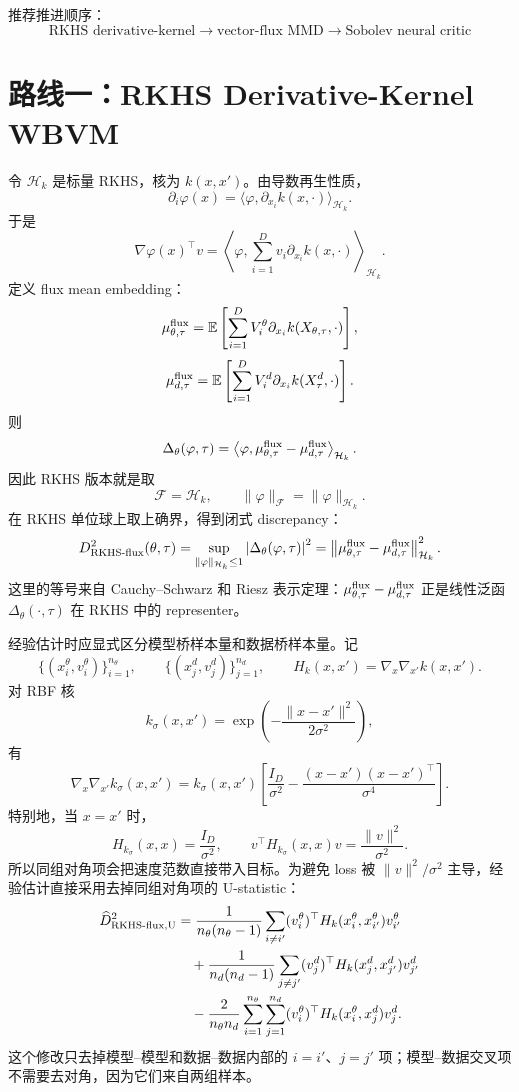 \documentclass[UTF8,11pt]{ctexart}
\newcommand{\E}{\mathbb{E}}
\newcommand{\cH}{\mathcal{H}}
\newcommand{\cF}{\mathcal{F}}
\begin{document}
推荐推进顺序：
\[
\boxed{
\text{RKHS derivative-kernel}
\rightarrow
\text{vector-flux MMD}
\rightarrow
\text{Sobolev neural critic}
}
\]

\section{路线一：RKHS Derivative-Kernel WBVM}

令 \(\cH_k\) 是标量 RKHS，核为 \(k(x,x')\)。由导数再生性质，
\[
\partial_i\varphi(x)
=
\langle \varphi,\partial_{x_i}k(x,\cdot)\rangle_{\cH_k}.
\]
于是
\[
\nabla\varphi(x)^\top v
=
\left\langle
\varphi,
\sum_{i=1}^D v_i\partial_{x_i}k(x,\cdot)
\right\rangle_{\cH_k}.
\]
定义 flux mean embedding：
\[
\mu_{\theta,\tau}^{\rm flux}
=
\E\left[
\sum_{i=1}^D V_i^\theta
\partial_{x_i}k(X_{\theta,\tau},\cdot)
\right],
\]
\[
\mu_{d,\tau}^{\rm flux}
=
\E\left[
\sum_{i=1}^D V_i^d
\partial_{x_i}k(X_\tau^d,\cdot)
\right].
\]
则
\[
\Delta_\theta(\varphi,\tau)
=
\left\langle
\varphi,
\mu_{\theta,\tau}^{\rm flux}
-
\mu_{d,\tau}^{\rm flux}
\right\rangle_{\cH_k}.
\]
因此 RKHS 版本就是取
\[
\cF=\cH_k,
\qquad
\|\varphi\|_{\cF}=\|\varphi\|_{\cH_k}.
\]
在 RKHS 单位球上取上确界，得到闭式 discrepancy：
\[
D_{\rm RKHS\text{-}flux}^2(\theta,\tau)
=
\sup_{\|\varphi\|_{\cH_k}\le 1}
\left|
\Delta_\theta(\varphi,\tau)
\right|^2
=
\left\|
\mu_{\theta,\tau}^{\rm flux}
-
\mu_{d,\tau}^{\rm flux}
\right\|_{\cH_k}^2.
\]
这里的等号来自 Cauchy--Schwarz 和 Riesz 表示定理：\(\mu_{\theta,\tau}^{\rm flux}-\mu_{d,\tau}^{\rm flux}\) 正是线性泛函 \(\Delta_\theta(\cdot,\tau)\) 在 RKHS 中的 representer。

经验估计时应显式区分模型桥样本量和数据桥样本量。记
\[
\{(x_i^\theta,v_i^\theta)\}_{i=1}^{n_\theta},
\qquad
\{(x_j^d,v_j^d)\}_{j=1}^{n_d},
\qquad
H_k(x,x')=\nabla_x\nabla_{x'}k(x,x').
\]
对 RBF 核
\[
k_\sigma(x,x')
=
\exp\left(-\frac{\|x-x'\|^2}{2\sigma^2}\right),
\]
有
\[
\nabla_x\nabla_{x'}k_\sigma(x,x')
=
k_\sigma(x,x')
\left[
\frac{I_D}{\sigma^2}
-
\frac{(x-x')(x-x')^\top}{\sigma^4}
\right].
\]
特别地，当 \(x=x'\) 时，
\[
H_{k_\sigma}(x,x)=\frac{I_D}{\sigma^2},
\qquad
v^\top H_{k_\sigma}(x,x)v
=
\frac{\|v\|^2}{\sigma^2}.
\]
所以同组对角项会把速度范数直接带入目标。为避免 loss 被 \(\|v\|^2/\sigma^2\) 主导，经验估计直接采用去掉同组对角项的 U-statistic：
\[
\begin{aligned}
\widehat D_{\rm RKHS\text{-}flux,U}^2
&=
\frac{1}{n_\theta(n_\theta-1)}
\sum_{i\ne i'}
(v_i^\theta)^\top
H_k(x_i^\theta,x_{i'}^\theta)
v_{i'}^\theta
\\
&\quad+
\frac{1}{n_d(n_d-1)}
\sum_{j\ne j'}
(v_j^d)^\top
H_k(x_j^d,x_{j'}^d)
v_{j'}^d
\\
&\quad-
\frac{2}{n_\theta n_d}
\sum_{i=1}^{n_\theta}\sum_{j=1}^{n_d}
(v_i^\theta)^\top
H_k(x_i^\theta,x_j^d)
v_j^d .
\end{aligned}
\]
这个修改只去掉模型--模型和数据--数据内部的 \(i=i'\)、\(j=j'\) 项；模型--数据交叉项不需要去对角，因为它们来自两组样本。
\end{document}
